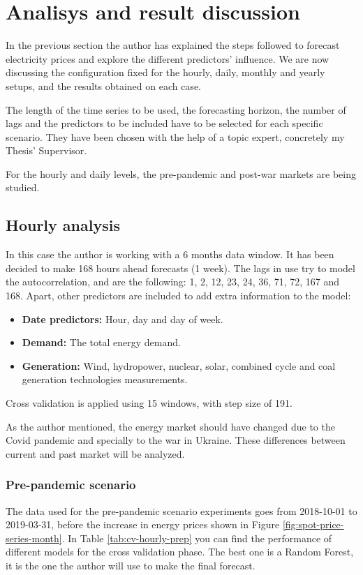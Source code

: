 \chapter{Analisys and result discussion}
In the previous section the author has explained the steps followed to forecast electricity prices and explore the different predictors' influence. We are now discussing the configuration fixed for the hourly, daily, monthly and yearly setups, and the results obtained on each case.

The length of the time series to be used, the forecasting horizon, the number of lags and the predictors to be included have to be selected for each specific scenario. They have been chosen with the help of a topic expert, concretely my Thesis' Supervisor.

For the hourly and daily levels, the pre-pandemic and post-war markets are being studied.

\newpage
\section{Hourly analysis}
In this case the author is working with a 6 months data window. It has been decided to make 168 hours ahead forecasts (1 week). The lags in use try to model the autocorrelation, and are the following: 1, 2, 12, 23, 24, 36, 71, 72, 167 and 168. Apart, other predictors are included to add extra information to the model:

\begin{itemize}
    \item \textbf{Date predictors:} Hour, day and day of week.
    \item \textbf{Demand:} The total energy demand.
    \item \textbf{Generation:} Wind, hydropower, nuclear, solar, combined cycle and coal generation technologies measurements.
\end{itemize}

Cross validation is applied using 15 windows, with step size of 191.

As the author mentioned, the energy market should have changed due to the Covid pandemic and specially to the war in Ukraine. These differences between current and past market will be analyzed.

\subsection{Pre-pandemic scenario}
The data used for the pre-pandemic scenario experiments goes from 2018-10-01 to 2019-03-31, before the increase in energy prices shown in Figure \ref{fig:spot-price-series-month}. In Table \ref{tab:cv-hourly-prep} you can find the performance of different models for the cross validation phase. The best one is a Random Forest, it is the one the author will use to make the final forecast.

